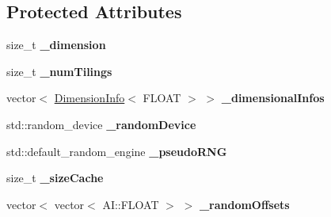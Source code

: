 \subsection*{Protected Attributes}
\begin{DoxyCompactItemize}
\item 
\hypertarget{classAI_1_1Algorithm_1_1TileCode_a3f5b849919d62c2167d28e06efcadb3b}{size\-\_\-t {\bfseries \-\_\-dimension}}\label{classAI_1_1Algorithm_1_1TileCode_a3f5b849919d62c2167d28e06efcadb3b}

\item 
\hypertarget{classAI_1_1Algorithm_1_1TileCode_ae45e259692f779b3d6881e74a3c944c5}{size\-\_\-t {\bfseries \-\_\-num\-Tilings}}\label{classAI_1_1Algorithm_1_1TileCode_ae45e259692f779b3d6881e74a3c944c5}

\item 
\hypertarget{classAI_1_1Algorithm_1_1TileCode_af55344828d37574d90f9bb0ed939cdba}{vector$<$ \hyperlink{classAI_1_1Algorithm_1_1DimensionInfo}{Dimension\-Info}$<$ F\-L\-O\-A\-T $>$ $>$ {\bfseries \-\_\-dimensional\-Infos}}\label{classAI_1_1Algorithm_1_1TileCode_af55344828d37574d90f9bb0ed939cdba}

\item 
\hypertarget{classAI_1_1Algorithm_1_1TileCode_a8b690cd8628f8772856ab914d8469f03}{std\-::random\-\_\-device {\bfseries \-\_\-random\-Device}}\label{classAI_1_1Algorithm_1_1TileCode_a8b690cd8628f8772856ab914d8469f03}

\item 
\hypertarget{classAI_1_1Algorithm_1_1TileCode_ae0ac4ab46768a4c60c0470851b974d92}{std\-::default\-\_\-random\-\_\-engine {\bfseries \-\_\-pseudo\-R\-N\-G}}\label{classAI_1_1Algorithm_1_1TileCode_ae0ac4ab46768a4c60c0470851b974d92}

\item 
\hypertarget{classAI_1_1Algorithm_1_1TileCode_a846472b750151c7478d5e0ebe48211b0}{size\-\_\-t {\bfseries \-\_\-size\-Cache}}\label{classAI_1_1Algorithm_1_1TileCode_a846472b750151c7478d5e0ebe48211b0}

\item 
\hypertarget{classAI_1_1Algorithm_1_1TileCode_a4a452f9c6cca4dace8c067fd24128584}{vector$<$ vector$<$ A\-I\-::\-F\-L\-O\-A\-T $>$ $>$ {\bfseries \-\_\-random\-Offsets}}\label{classAI_1_1Algorithm_1_1TileCode_a4a452f9c6cca4dace8c067fd24128584}

\end{DoxyCompactItemize}


